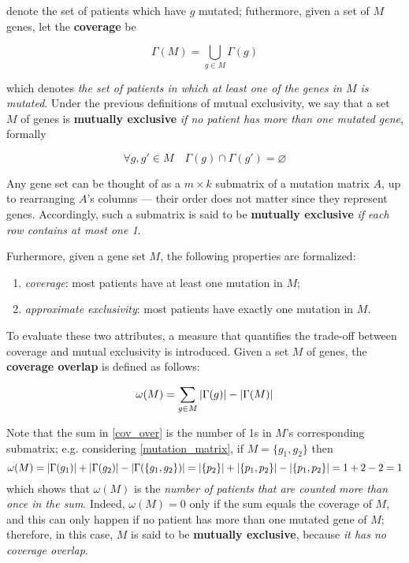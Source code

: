 denote the set of patients which have $g$ mutated; futhermore, given a set of $M$ genes, let the \textbf{coverage} be

\begin{equation}
    \Gamma(M) = \bigcup_{g \in M}{\Gamma(g)}
\end{equation}

which denotes \textit{the set of patients in which at least one of the genes in $M$ is mutated}. Under the previous definitions of mutual exclusivity, we say that a set $M$ of genes is \textbf{mutually exclusive} \textit{if no patient has more than one mutated gene}, formally

\begin{equation}
    \forall g, g' \in M \quad \Gamma(g) \cap \Gamma(g') = \varnothing
\end{equation}

Any gene set can be thought of as a $m \times k$ submatrix of a mutation matrix $A$, up to rearranging $A$'s columns --- their order does not matter since they represent genes. Accordingly, such a submatrix is said to be \textbf{mutually exclusive} \textit{if each row contains at most one 1}.

Furhermore, given a gene set $M$, the following properties are formalized:

\begin{enumerate}[label=\roman*), font=\itshape]
    \item \textit{coverage}: most patients have at least one mutation in $M$;
    \item \textit{approximate exclusivity}: most patients have exactly one mutation in $M$.
\end{enumerate}

To evaluate these two attributes, a measure that quantifies the trade-off between coverage and mutual exclusivity is introduced. Given a set $M$ of genes, the \textbf{coverage overlap} is defined as follows:

\begin{equation}\label{cov_over}
    \omega(M) = \sum_{g \in M}{\left|\Gamma(g)\right|} - \left|\Gamma(M)\right|
\end{equation}

Note that the sum in \cref{cov_over} is the number of 1s in $M$'s corresponding submatrix; e.g. considering \cref{mutation_matrix}, if $M=\{g_1, g_2\}$ then $$\omega(M)=\left|\Gamma(g_1)\right| + \left|\Gamma(g_2)\right| - \left|\Gamma(\{g_1, g_2\})\right| = \left|\{p_2\}\right| + \left|\{p_1, p_2\}\right| - \left|\{p_1, p_2\}\right| = 1 + 2 - 2 = 1$$ which shows that $\omega(M)$ is the \textit{number of patients that are counted more than once in the sum}. Indeed, $\omega(M) = 0$ only if the sum equals the coverage of $M$, and this can only happen if no patient has more than one mutated gene of $M$; therefore, in this case, $M$ is said to be \textbf{mutually exclusive}, because \textit{it has no coverage overlap}.

